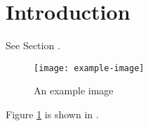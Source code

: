 \documentclass{article}
\begin{document}
\section{Introduction}
\label{sec:intro}

See Section .

\begin{figure}[h]
    \centering
    \texttt{[image: example-image]}
    \caption{An example image}
    \label{fig:example}
\end{figure}

Figure \ref{fig:example} is shown in .
\end{document}
